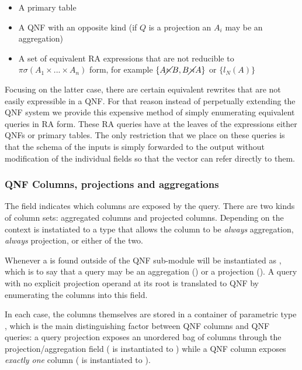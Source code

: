 \begin{itemize}
\item A primary table
\item A QNF with an opposite kind  (if \(Q\) is a
  projection an \(A_i\) may be an aggregation)
\item A set of equivalent RA expressions that are not reducible to
  \(\pi \sigma(A_1 \times ... \times A_n)\) form, for example \(\{A \cancel\ltimes
  B,B \cancel\rtimes A\}\) or \(\{l_N(A)\}\)
\end{itemize}

Focusing on the latter case, there are certain equivalent rewrites
that are not easily expressible in a QNF. For that reason instead of
perpetually extending the QNF system we provide this expensive method
of simply enumerating equivalent queries in RA form. These RA queries
have at the leaves of the expressions either QNFs or primary
tables. The only restriction that we place on these queries is that
the schema of the inputs is simply forwarded to the output without
modification of the individual fields so that the  vector can
refer directly to them.

\subsubsection{QNF Columns, projections and aggregations}
\label{sec:qnf_proj_aggr}

The  field
indicates which columns are exposed by the query. There are two kinds
of column sets: aggregated columns and projected columns. Depending on
the context  is instatiated to a type that allows the
column to be \emph{always} aggregation, \emph{always} projection, or
either of the two.

Whenever a  is found outside of the QNF sub-module
 will be instantiated as , which is to say
that a query may be an aggregation () or a projection
(). A query with no explicit projection operand at its root is
translated to QNF by enumerating the columns into this field.

In each case, the columns themselves are stored in a container of parametric type , which is
the main distinguishing factor between QNF columns and QNF queries: a query
projection exposes an unordered bag of columns through the projection/aggregation
field ( is instantiated to ) while a QNF column exposes
\emph{exactly one} column ( is instantiated to ).

